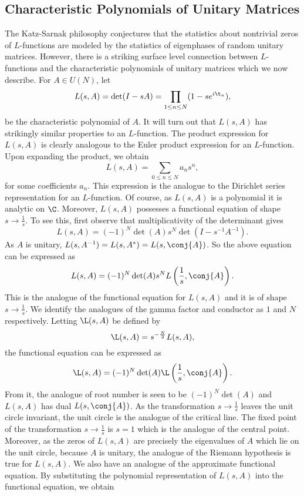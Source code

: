     \subsection*{Characteristic Polynomials of Unitary Matrices}
      The Katz-Sarnak philosophy conjectures that the statistics about nontrivial zeros of $L$-functions are modeled by the statistics of eigenphases of random unitary matrices. However, there is a striking surface level connection between $L$-functions and the characteristic polynomials of unitary matrices which we now describe. For $A \in U(N)$, let
      \[
        L(s,A) = \det(I-sA) = \prod_{1 \le n \le N}(1-se^{i\t_{n}}),
      \]
      be the characteristic polynomial of $A$. It will turn out that $L(s,A)$ has strikingly similar properties to an $L$-function. The product expression for $L(s,A)$ is clearly analogous to the Euler product expression for an $L$-function. Upon expanding the product, we obtain
      \[
        L(s,A) = \sum_{0 \le n \le N}a_{n}s^{n},
      \]
      for some coefficients $a_{n}$. This expression is the analogue to the Dirichlet series representation for an $L$-function. Of course, as $L(s,A)$ is a polynomial it is analytic on $\C$. Moreover, $L(s,A)$ possesses a functional equation of shape $s \to \frac{1}{s}$. To see this, first observe that multiplicativity of the determinant gives
      \[
        L(s,A) = (-1)^{N}\det(A)s^{N}\det(I-s^{-1}A^{-1}).
      \]
      As $A$ is unitary, $L(s,A^{-1}) = L(s,A^{\ast}) = L(s,\conj{A})$. So the above equation can be expressed as
      \[
        L(s,A) = (-1)^{N}\det(A)s^{N}L\left(\frac{1}{s},\conj{A}\right).
      \]
      This is the analogue of the functional equation for $L(s,A)$ and it is of shape $s \to \frac{1}{s}$. We identify the analogues of the gamma factor and conductor as $1$ and $N$ respectively. Letting $\L(s,A)$ be defined by
      \[
        \L(s,A) = s^{-\frac{N}{2}}L(s,A),
      \]
      the functional equation can be expressed as
      \[
         \L(s,A) = (-1)^{N}\det(A) \L\left(\frac{1}{s},\conj{A}\right).
      \]
      From it, the analogue of root number is seen to be $(-1)^{N}\det(A)$ and $L(s,A)$ has dual $L(s,\conj{A})$. As the transformation $s \to \frac{1}{s}$ leaves the unit circle invariant, the unit circle is the analogue of the critical line. The fixed point of the transformation $s \to \frac{1}{s}$ is $s = 1$ which is the analogue of the central point. Moreover, as the zeros of $L(s,A)$ are precisely the eigenvalues of $A$ which lie on the unit circle, because $A$ is unitary, the analogue of the Riemann hypothesis is true for $L(s,A)$. We also have an analogue of the approximate functional equation. By substituting the polynomial representation of $L(s,A)$ into the functional equation, we obtain
